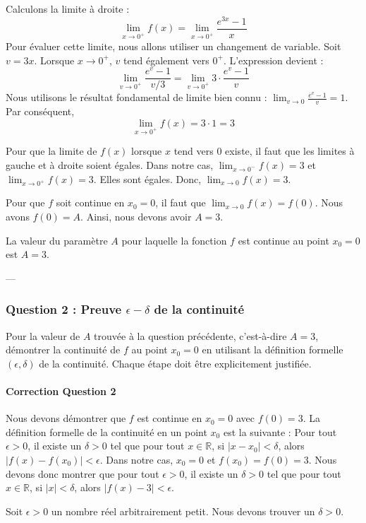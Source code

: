 \documentclass[12pt,a4paper]{report}
\begin{document}
Calculons la limite à droite :
$$ \lim_{x \to 0^+} f(x) = \lim_{x \to 0^+} \frac{e^{3x} - 1}{x} $$
Pour évaluer cette limite, nous allons utiliser un changement de variable.
Soit $v = 3x$. Lorsque $x \to 0^+$, $v$ tend également vers $0^+$.
L'expression devient :
$$ \lim_{v \to 0^+} \frac{e^{v} - 1}{v/3} = \lim_{v \to 0^+} 3 \cdot \frac{e^{v} - 1}{v} $$
Nous utilisons le résultat fondamental de limite bien connu : $\lim_{v \to 0} \frac{e^{v} - 1}{v} = 1$.
Par conséquent,
$$ \lim_{x \to 0^+} f(x) = 3 \cdot 1 = 3 $$

Pour que la limite de $f(x)$ lorsque $x$ tend vers $0$ existe, il faut que les limites à gauche et à droite soient égales. Dans notre cas, $\lim_{x \to 0^-} f(x) = 3$ et $\lim_{x \to 0^+} f(x) = 3$. Elles sont égales.
Donc, $\lim_{x \to 0} f(x) = 3$.

Pour que $f$ soit continue en $x_0 = 0$, il faut que $\lim_{x \to 0} f(x) = f(0)$.
Nous avons $f(0) = A$.
Ainsi, nous devons avoir $A = 3$.

La valeur du paramètre $A$ pour laquelle la fonction $f$ est continue au point $x_0 = 0$ est $A=3$.

---

\subsubsection{Question 2 : Preuve $\epsilon-\delta$ de la continuité}

Pour la valeur de $A$ trouvée à la question précédente, c'est-à-dire $A=3$, démontrer la continuité de $f$ au point $x_0 = 0$ en utilisant la définition formelle $(\epsilon, \delta)$ de la continuité. Chaque étape doit être explicitement justifiée.

\paragraph{Correction Question 2}

Nous devons démontrer que $f$ est continue en $x_0 = 0$ avec $f(0) = 3$.
La définition formelle de la continuité en un point $x_0$ est la suivante :
Pour tout $\epsilon > 0$, il existe un $\delta > 0$ tel que pour tout $x \in \mathbb{R}$, si $|x - x_0| < \delta$, alors $|f(x) - f(x_0)| < \epsilon$.
Dans notre cas, $x_0 = 0$ et $f(x_0) = f(0) = 3$. Nous devons donc montrer que pour tout $\epsilon > 0$, il existe un $\delta > 0$ tel que pour tout $x \in \mathbb{R}$, si $|x| < \delta$, alors $|f(x) - 3| < \epsilon$.

Soit $\epsilon > 0$ un nombre réel arbitrairement petit. Nous devons trouver un $\delta > 0$.
\end{document}
